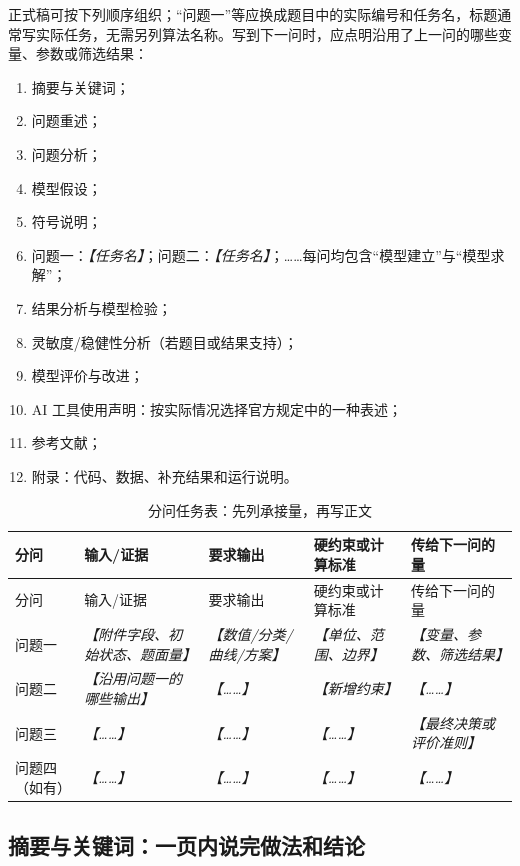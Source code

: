 \documentclass[UTF8,zihao=-4]{ctexart}
\newcommand{\slot}[1]{\textcolor{inkblue}{\textit{【#1】}}}
\begin{document}
正式稿可按下列顺序组织；“问题一”等应换成题目中的实际编号和任务名，标题通常写实际任务，无需另列算法名称。写到下一问时，应点明沿用了上一问的哪些变量、参数或筛选结果：

\begin{enumerate}
  \item 摘要与关键词；
  \item 问题重述；
  \item 问题分析；
  \item 模型假设；
  \item 符号说明；
  \item 问题一：\slot{任务名}；问题二：\slot{任务名}；……每问均包含“模型建立”与“模型求解”；
  \item 结果分析与模型检验；
  \item 灵敏度/稳健性分析（若题目或结果支持）；
  \item 模型评价与改进；
  \item AI 工具使用声明：按实际情况选择官方规定中的一种表述；
  \item 参考文献；
  \item 附录：代码、数据、补充结果和运行说明。
\end{enumerate}

\begin{longtable}{p{1.2cm}p{3.0cm}p{3.0cm}p{3.0cm}p{4.2cm}}
\caption{分问任务表：先列承接量，再写正文}\label{tab:template-task-matrix}\\
\toprule
分问 & 输入/证据 & 要求输出 & 硬约束或计算标准 & 传给下一问的量\\
\midrule
\endfirsthead
\toprule
分问 & 输入/证据 & 要求输出 & 硬约束或计算标准 & 传给下一问的量\\
\midrule
\endhead
问题一 & \slot{附件字段、初始状态、题面量} & \slot{数值/分类/曲线/方案} & \slot{单位、范围、边界} & \slot{变量、参数、筛选结果}\\
问题二 & \slot{沿用问题一的哪些输出} & \slot{……} & \slot{新增约束} & \slot{……}\\
问题三 & \slot{……} & \slot{……} & \slot{……} & \slot{最终决策或评价准则}\\
问题四（如有） & \slot{……} & \slot{……} & \slot{……} & \slot{……}\\
\bottomrule
\end{longtable}

\subsection{摘要与关键词：一页内说完做法和结论}
\end{document}
